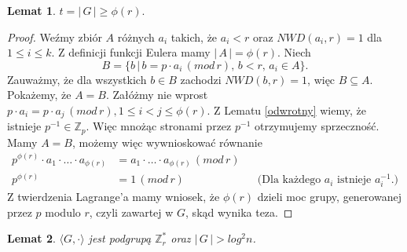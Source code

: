 \documentclass[declaration,shortabstract]{iithesis}
\theoremstyle{definition}
\theoremstyle{remark} \newtheorem{observation}{Obserwacja}
\theoremstyle{plain} \newtheorem{theorem}{Twierdzenie}
\theoremstyle{plain} \newtheorem{lemma}{Lemat}
\theoremstyle{remark} \newtheorem*{remark*}{Uwaga}
\theoremstyle{reminder} \newtheorem*{reminder*}{Przypomnienie}
\begin{document}
\begin{lemma} \label{phi_r}
	$t = | \, G \, | \geq \phi(r).$
\end{lemma}
	
\begin{proof}
	Weźmy zbiór $A$ różnych $a_i$ takich, że $a_i < r$ oraz $NWD(a_i, r) = 1$ dla ${1 \leq i \leq k}$. Z definicji funkcji Eulera mamy $| \, A \, | = \phi(r)$. Niech \[B = \{b \, | \, b = p \cdot a_i \, (mod \, r), \, b < r, \, a_i \in A\}.\] Zauważmy, że dla wszystkich $b \in B$ zachodzi $NWD(b, r) = 1$, więc $B \subseteq A.$ Pokażemy, że $A = B$. Załóżmy nie wprost $p \cdot a_i = p \cdot a_j \, (mod \, r), 1 \leq i < j \leq \phi(r)$. Z Lematu \ref{odwrotny} wiemy, że istnieje $p^{-1} \in \mathbb{Z}_p$. Więc mnożąc stronami przez $p^{-1}$ otrzymujemy sprzeczność. \newline
	Mamy $A = B$, możemy więc wywnioskować równanie 
	\begin{align*}
		p^{\phi(r)} \cdot a_1 \cdot \dots \cdot a_{\phi(r)} &= a_1 \cdot \dots \cdot a_{\phi(r)} \, (mod \, r) \\
		p^{\phi(r)} & = 1 \, (mod \, r) &   & \text{(Dla każdego $a_i$ istnieje $a_i^{-1}$.)} 
	\end{align*}
	Z twierdzenia Lagrange'a mamy wniosek, że $\phi(r)$ dzieli moc grupy, generowanej przez $p$ modulo $r$, czyli zawartej w $G$, skąd wynika teza.
\end{proof}

\begin{lemma}\label{el_odwr}
	$\langle G, \cdot \rangle$ jest podgrupą $\mathbb{Z}_r^*$ oraz $|\,G\,| > log^2n$.
\end{lemma}
	
\end{document}
